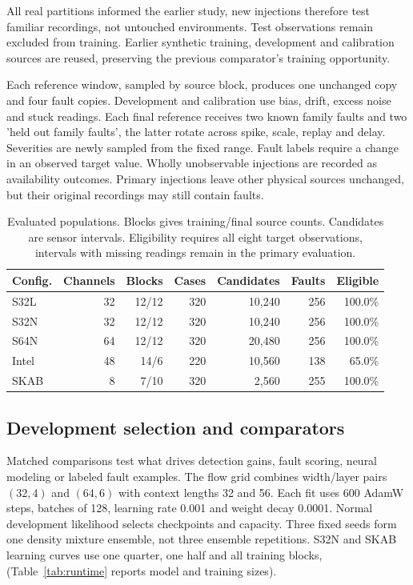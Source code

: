 \documentclass[conference]{IEEEtran}
\newcommand{\1}{\mathbf{1}}
\begin{document}
All real partitions informed the earlier study, new injections therefore test familiar recordings, not untouched environments. Test observations remain excluded from training. Earlier synthetic training, development and calibration sources are reused, preserving the previous comparator's training opportunity.

Each reference window, sampled by source block, produces one unchanged copy and four fault copies. Development and calibration use bias, drift, excess noise and stuck readings. Each final reference receives two known family faults and two 'held out family faults', the latter rotate across spike, scale, replay and delay. Severities are newly sampled from the fixed range. Fault labels require a change in an observed target value. Wholly unobservable injections are recorded as availability outcomes. Primary injections leave other physical sources unchanged, but their original recordings may still contain faults.

\begin{table}[t]
\centering
\caption{Evaluated populations. Blocks gives training/final source counts. Candidates are sensor intervals. Eligibility requires all eight target observations, intervals with missing readings remain in the primary evaluation.}
\label{tab:data}
\small
\begin{tabular}{lrrrrrr}
\toprule
Config. & Channels & Blocks & Cases & Candidates & Faults & Eligible \\
\midrule
S32L & 32 & 12/12 & 320 & 10,240 & 256 & 100.0\% \\
S32N & 32 & 12/12 & 320 & 10,240 & 256 & 100.0\% \\
S64N & 64 & 12/12 & 320 & 20,480 & 256 & 100.0\% \\
Intel & 48 & 14/6 & 220 & 10,560 & 138 & 65.0\% \\
SKAB & 8 & 7/10 & 320 & 2,560 & 255 & 100.0\% \\
\bottomrule
\end{tabular}
\end{table}



\subsection{Development selection and comparators}
Matched comparisons test what drives detection gains, fault scoring, neural modeling or labeled fault examples. The flow grid combines width/layer pairs $(32,4)$ and $(64,6)$ with context lengths 32 and 56. Each fit uses 600 AdamW steps, batches of 128, learning rate 0.001 and weight decay 0.0001. Normal development likelihood selects checkpoints and capacity. Three fixed seeds form one density mixture ensemble, not three ensemble repetitions. S32N and SKAB learning curves use one quarter, one half and all training blocks, (Table~\ref{tab:runtime} reports model and training sizes).
\end{document}
